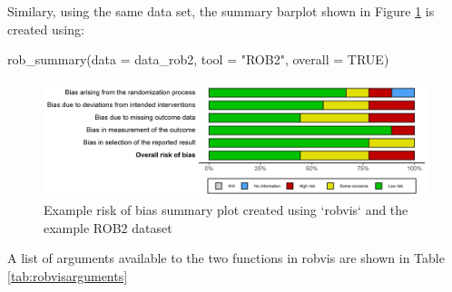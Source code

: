 \documentclass[a4paper, twoside]{templates/ociamthesis}
\newenvironment{Shaded}{\begin{snugshade}}{\end{snugshade}}
\newcommand{\AttributeTok}[1]{\textcolor[rgb]{0.77,0.63,0.00}{#1}}
\newcommand{\ConstantTok}[1]{\textcolor[rgb]{0.00,0.00,0.00}{#1}}
\newcommand{\FunctionTok}[1]{\textcolor[rgb]{0.00,0.00,0.00}{#1}}
\newcommand{\NormalTok}[1]{#1}
\newcommand{\StringTok}[1]{\textcolor[rgb]{0.31,0.60,0.02}{#1}}
\renewenvironment{Shaded}
{
  \vspace{4pt}%
  \begin{snugshade}%
}{%
  \end{snugshade}%
  \vspace{4pt}%
}
\begin{document}
Similary, using the same data set, the summary barplot shown in Figure \ref{fig:summaryplot} is created using:

\begin{Shaded}
\begin{Highlighting}[]
\FunctionTok{rob\_summary}\NormalTok{(}\AttributeTok{data =}\NormalTok{ data\_rob2,}
            \AttributeTok{tool =} \StringTok{"ROB2"}\NormalTok{, }
            \AttributeTok{overall =} \ConstantTok{TRUE}\NormalTok{)}
\end{Highlighting}
\end{Shaded}

\begin{figure}
\includegraphics[width=1\linewidth]{figures/sys-rev-tools/example-rob-summary-barplot} \caption{Example risk of bias summary plot created using `robvis` and the example ROB2 dataset}\label{fig:summaryplot}
\end{figure}

A list of arguments available to the two functions in robvis are shown in Table \ref{tab:robvisarguments}

~

\begingroup\fontsize{9}{11}\selectfont
\end{document}
